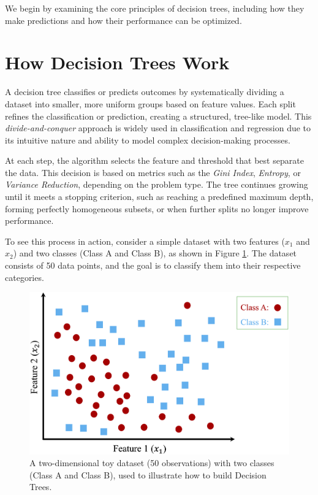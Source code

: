 \documentclass[
]{book}
\theoremstyle{definition}
\theoremstyle{definition}
\theoremstyle{definition}
\theoremstyle{definition}
\theoremstyle{remark}
\begin{document}
We begin by examining the core principles of decision trees, including how they make predictions and how their performance can be optimized.

\section{How Decision Trees Work}\label{how-decision-trees-work}

A decision tree classifies or predicts outcomes by systematically dividing a dataset into smaller, more uniform groups based on feature values. Each split refines the classification or prediction, creating a structured, tree-like model. This \emph{divide-and-conquer} approach is widely used in classification and regression due to its intuitive nature and ability to model complex decision-making processes.

At each step, the algorithm selects the feature and threshold that best separate the data. This decision is based on metrics such as the \emph{Gini Index}, \emph{Entropy}, or \emph{Variance Reduction}, depending on the problem type. The tree continues growing until it meets a stopping criterion, such as reaching a predefined maximum depth, forming perfectly homogeneous subsets, or when further splits no longer improve performance.

To see this process in action, consider a simple dataset with two features (\(x_1\) and \(x_2\)) and two classes (Class A and Class B), as shown in Figure \ref{fig:tree-1}. The dataset consists of 50 data points, and the goal is to classify them into their respective categories.

\begin{figure}

{\centering \includegraphics[width=0.7\linewidth]{images/ch11_ex_tree_1} 

}

\caption{A two-dimensional toy dataset (50 observations) with two classes (Class A and Class B), used to illustrate how to build Decision Trees.}\label{fig:tree-1}
\end{figure}
\end{document}
